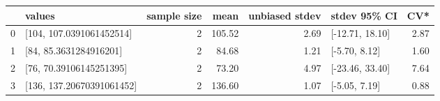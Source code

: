 \begin{tabular}{llrrrlr}
\toprule
 & values & sample size & mean & unbiased stdev & stdev 95\% CI & CV* \\
\midrule
0 & [104, 107.0391061452514] & 2 & 105.52 & 2.69 & [-12.71, 18.10] & 2.87 \\
1 & [84, 85.3631284916201] & 2 & 84.68 & 1.21 & [-5.70, 8.12] & 1.60 \\
2 & [76, 70.39106145251395] & 2 & 73.20 & 4.97 & [-23.46, 33.40] & 7.64 \\
3 & [136, 137.20670391061452] & 2 & 136.60 & 1.07 & [-5.05, 7.19] & 0.88 \\
\bottomrule
\end{tabular}
